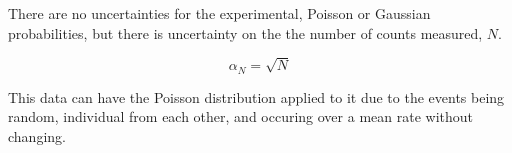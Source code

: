 \documentclass[twocolumn]{revtex4}
\begin{document}
There are no uncertainties for the experimental, Poisson or Gaussian probabilities, but there is uncertainty on the the number of counts measured, $N$. 

\begin{equation} \tag{8}
\alpha_{N}=\sqrt{N}
\end{equation}

This data can have the Poisson distribution applied to it due to the events being random, individual from each other, and occuring over a mean rate without changing.   

\end{document}
